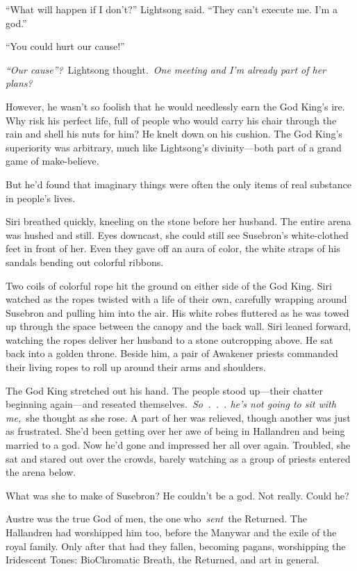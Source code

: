 “What will happen if I don’t?” Lightsong said. “They can’t execute me. I’m a god.”

“You could hurt our cause!”

\textit{“Our cause”?}~Lightsong thought.~\textit{One meeting and I’m already part of her plans?}

However, he wasn’t so foolish that he would needlessly earn the God King’s ire. Why risk his perfect life, full of people who would carry his chair through the rain and shell his nuts for him? He knelt down on his cushion. The God King’s superiority was arbitrary, much like Lightsong’s divinity—both part of a grand game of make-believe.

But he’d found that imaginary things were often the only items of real substance in people’s lives.

\orn

Siri breathed quickly, kneeling on the stone before her husband. The entire arena was hushed and still. Eyes downcast, she could still see Susebron’s white-clothed feet in front of her. Even they gave off an aura of color, the white straps of his sandals bending out colorful ribbons.

Two coils of colorful rope hit the ground on either side of the God King. Siri watched as the ropes twisted with a life of their own, carefully wrapping around Susebron and pulling him into the air. His white robes fluttered as he was towed up through the space between the canopy and the back wall. Siri leaned forward, watching the ropes deliver her husband to a stone outcropping above. He sat back into a golden throne. Beside him, a pair of Awakener priests commanded their living ropes to roll up around their arms and shoulders.

The God King stretched out his hand. The people stood up—their chatter beginning again—and reseated themselves.~\textit{So~.~.~. he’s not going to sit with me,}~she thought as she rose. A part of her was relieved, though another was just as frustrated. She’d been getting over her awe of being in Hallandren and being married to a god. Now he’d gone and impressed her all over again. Troubled, she sat and stared out over the crowds, barely watching as a group of priests entered the arena below.

What was she to make of Susebron? He couldn’t be a god. Not really. Could he?

Austre was the true God of men, the one who~\textit{sent}~the Returned. The Hallandren had worshipped him too, before the Manywar and the exile of the royal family. Only after that had they fallen, becoming pagans, worshipping the Iridescent Tones: BioChromatic Breath, the Returned, and art in general.

